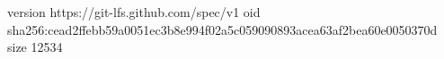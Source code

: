 version https://git-lfs.github.com/spec/v1
oid sha256:cead2ffebb59a0051ec3b8e994f02a5c059090893acea63af2bea60e0050370d
size 12534
